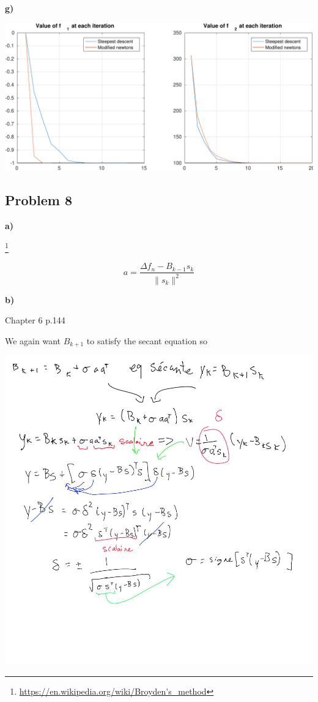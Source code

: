 \textbf{g)}

\answer

\includegraphics[width=\linewidth]{fig/unconstrained_exercices/pb7_1-crop}


\subsection{Problem 8}

\textbf{a)} 

\answer \footnote{\url{https://en.wikipedia.org/wiki/Broyden's_method}}


\[
	a = \frac{\Delta f_n - B_{k-1}s_k}{\| s_k\|^2}
\]

\textbf{b)}

\answer 

Chapter 6 p.144

We again want $B_{k+1}$ to satisfy the secant equation so 

\includegraphics[scale=0.5]{fig/unconstrained_exercices/pb8_b}

